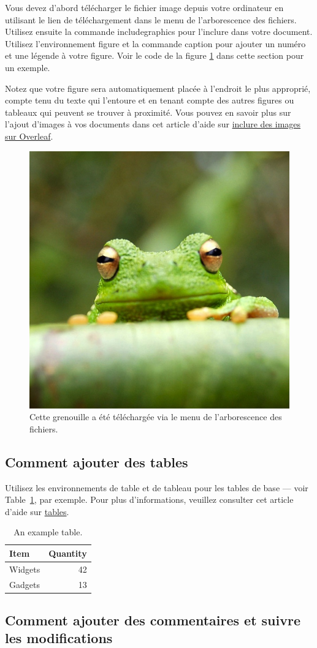 \documentclass{article}
\begin{document}
Vous devez d’abord télécharger le fichier image depuis votre ordinateur en utilisant le lien de téléchargement dans le menu de l’arborescence des fichiers. Utilisez ensuite la commande includegraphics pour l'inclure dans votre document. Utilisez l'environnement figure et la commande caption pour ajouter un numéro et une légende à votre figure. Voir le code de la figure \ref{fig:frog} dans cette section pour un exemple.

Notez que votre figure sera automatiquement placée à l'endroit le plus approprié, compte tenu du texte qui l'entoure et en tenant compte des autres figures ou tableaux qui peuvent se trouver à proximité. Vous pouvez en savoir plus sur l'ajout d'images à vos documents dans cet article d'aide sur \href{https://www.overleaf.com/learn/how-to/Including_images_on_Overleaf}{inclure des images sur Overleaf}.

\begin{figure}
\centering
\includegraphics[width=0.25\linewidth]{frog.jpg}
\caption{\label{fig:frog}Cette grenouille a été téléchargée via le menu de l'arborescence des fichiers.}
\end{figure}

\subsection{Comment ajouter des tables}

Utilisez les environnements de table et de tableau pour les tables de base --- voir Table~\ref{tab:widgets}, par exemple. Pour plus d'informations, veuillez consulter cet article d'aide sur \href{https://www.overleaf.com/learn/latex/tables}{tables}.

\begin{table}
\centering
\begin{tabular}{l|r}
Item & Quantity \\\hline
Widgets & 42 \\
Gadgets & 13
\end{tabular}
\caption{\label{tab:widgets}An example table.}
\end{table}

\subsection{Comment ajouter des commentaires et suivre les modifications}
\end{document}
